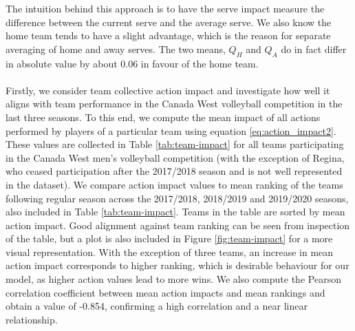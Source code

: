 \documentclass{sfuthesis}
\begin{document}
	The intuition behind this approach is to have the serve impact measure the difference between the current serve and the average serve. We also know the home team tends to have a slight advantage, which is the reason for separate averaging of home and away serves. The two means, $Q_H$ and $Q_A$ do in fact differ in absolute value by about 0.06 in favour of the home team.\\\\
	Firstly, we consider team collective action impact and investigate how well it aligns with team performance in the Canada West volleyball competition in the last three seasons. To this end, we compute the mean impact of all actions performed by players of a particular team using equation \eqref{eq:action_impact2}. These values are collected in Table \ref{tab:team-impact} for all teams participating in the Canada West men's volleyball competition (with the exception of Regina, who ceased participation after the 2017/2018 season and is not well represented in the dataset). We compare action impact values to mean ranking of the teams following regular season across the 2017/2018, 2018/2019 and 2019/2020 seasons, also included in Table \ref{tab:team-impact}. Teams in the table are sorted by mean action impact. Good alignment against team ranking can be seen from inspection of the table, but a plot is also included in Figure \ref{fig:team-impact} for a more visual representation. With the exception of three teams, an increase in mean action impact corresponds to higher ranking, which is desirable behaviour for our model, as higher action values lead to more wins. We also compute the Pearson correlation coefficient between mean action impacts and mean rankings and obtain a value of -0.854, confirming a high correlation and a near linear relationship.\\
\end{document}
